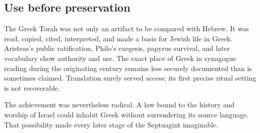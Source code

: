 \subsection{Use before preservation}

The Greek Torah was not only an artifact to be compared with Hebrew. It was read, copied, cited, interpreted, and made a basis for Jewish life in Greek. Aristeas's public ratification, Philo's exegesis, papyrus survival, and later vocabulary show authority and use. The exact place of Greek in synagogue reading during the originating century remains less securely documented than is sometimes claimed. Translation surely served access; its first precise ritual setting is not recoverable.

The achievement was nevertheless radical. A law bound to the history and worship of Israel could inhabit Greek without surrendering its source language. That possibility made every later stage of the Septuagint imaginable.
